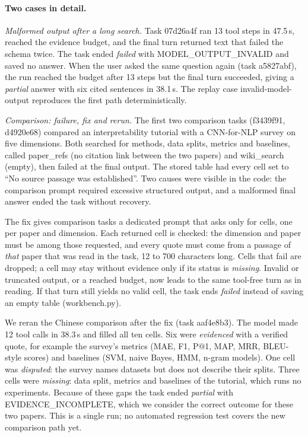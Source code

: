 \documentclass{article}
\newcommand{\code}[1]{{\ttfamily\small\hyphenchar\font=-1\relax #1}}
\begin{document}
\paragraph{Two cases in detail.}
\emph{Malformed output after a long search.} Task \code{07d26a4f} ran 13 tool steps in 47.5\,s, reached
the evidence budget, and the final turn returned text that failed the schema twice. The task ended
\emph{failed} with \code{MODEL\_OUTPUT\_INVALID} and saved no answer. When the user asked the same
question again (task \code{a5827abf}), the run reached the budget after 13 steps but the final turn
succeeded, giving a \emph{partial} answer with six cited sentences in 38.1\,s. The replay case
\code{invalid-model-output} reproduces the first path deterministically.

\emph{Comparison: failure, fix and rerun.} The first two comparison tasks (\code{f3439f91},
\code{d4920e68}) compared an interpretability tutorial with a CNN-for-NLP survey on five dimensions.
Both searched for methods, data splits, metrics and baselines, called \code{paper\_refs} (no citation
link between the two papers) and \code{wiki\_search} (empty), then failed at the final output. The
stored table had every cell set to ``No source passage was established''. Two causes were visible in
the code: the comparison prompt required excessive structured output, and a malformed final answer ended the task without recovery.

The fix gives comparison tasks a dedicated prompt that asks only for cells, one per paper and dimension. Each returned cell is checked: the
dimension and paper must be among those requested, and every quote must come from a passage of
\emph{that} paper that was read in the task, 12 to 700 characters long. Cells that fail are dropped;
a cell may stay without evidence only if its status is \emph{missing}. Invalid or truncated output, or a
reached budget, now leads to the same tool-free turn as in reading. If that turn still yields no valid
cell, the task ends \emph{failed} instead of saving an empty table (\code{workbench.py}).

We reran the Chinese comparison after the fix (task \code{aaf4e8b3}). The model made 12 tool calls in
38.3\,s and filled all ten cells. Six were \emph{evidenced} with a verified quote, for example the
survey's metrics (MAE, F1, P@1, MAP, MRR, BLEU-style scores) and baselines (SVM, naive Bayes, HMM,
n-gram models). One cell was \emph{disputed}: the survey names datasets but does not describe their
splits. Three cells were \emph{missing}: data split, metrics and baselines of the tutorial, which runs no
experiments. Because of these gaps the task ended \emph{partial} with \code{EVIDENCE\_INCOMPLETE}, which
we consider the correct outcome for these two papers. This is a single run; no automated regression
test covers the new comparison path yet.
\end{document}
